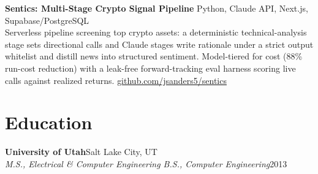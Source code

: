 \documentclass[10.5pt, letterpaper]{article}
\newcommand{\jobentry}[4]{%
  \noindent
  \textbf{\color{accent}#1}\hfill\textcolor{muted}{\small #2}\\
  \textit{#3}\hfill\textcolor{muted}{\small #4}%
}
\begin{document}
\vspace{5pt}

\noindent\textbf{Sentics: Multi-Stage Crypto Signal Pipeline}
\hfill\textcolor{muted}{\small Python, Claude API, Next.js, Supabase/PostgreSQL}\\
Serverless pipeline screening top crypto assets: a deterministic
technical-analysis stage sets directional calls and Claude stages write rationale
under a strict output whitelist and distill news into structured sentiment.
Model-tiered for cost (88\% run-cost reduction) with a leak-free forward-tracking
eval harness scoring live calls against realized returns.
\hfill\textcolor{muted}{\small\href{https://github.com/jsanders5/sentics}{github.com/jsanders5/sentics}}

\section{Education}

\jobentry{University of Utah}{Salt Lake City, UT}%
  {M.S., Electrical \& Computer Engineering \enspace\textbullet\enspace
   B.S., Computer Engineering}{2013}
\end{document}
